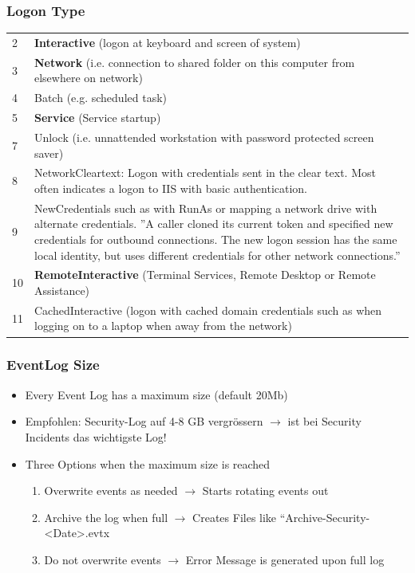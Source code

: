 \subsubsection{Logon Type}
\begin{tabular}{ l | p{6cm} }
     2 & \textbf{Interactive} (logon at keyboard and screen of system) \\
     3 & \textbf{Network} (i.e. connection to shared folder on this computer from elsewhere on network) \\  
     4 & Batch (e.g. scheduled task) \\  
     5 & \textbf{Service} (Service startup) \\
     7 & Unlock (i.e. unnattended workstation with password protected screen saver) \\
     8 & NetworkCleartext: Logon with credentials sent in the clear text. Most often indicates a logon to IIS with basic authentication. \\
     9 & NewCredentials such as with RunAs or mapping a network drive with alternate credentials. ''A caller cloned its current token and specified new credentials for outbound connections. The new logon session has the same local identity, but uses different credentials for other network connections.'' \\
     10 & \textbf{RemoteInteractive} (Terminal Services, Remote Desktop or Remote Assistance) \\
     11 & CachedInteractive (logon with cached domain credentials such as when logging on to a laptop when away from the network)
\end{tabular}

\subsubsection{EventLog Size}
\begin{itemize}
    \item Every Event Log has a maximum size (default 20Mb)
    \item Empfohlen: Security-Log auf 4-8 GB vergrössern $\rightarrow$ ist bei Security Incidents das wichtigste Log!
    \item Three Options when the maximum size is reached
    \begin{enumerate}
        \item Overwrite events as needed $\rightarrow$ Starts rotating events out
        \item Archive the log when full $\rightarrow$ Creates Files like “Archive-Security-<Date>.evtx
        \item Do not overwrite events $\rightarrow$ Error Message is generated upon full log
    \end{enumerate}
\end{itemize}

